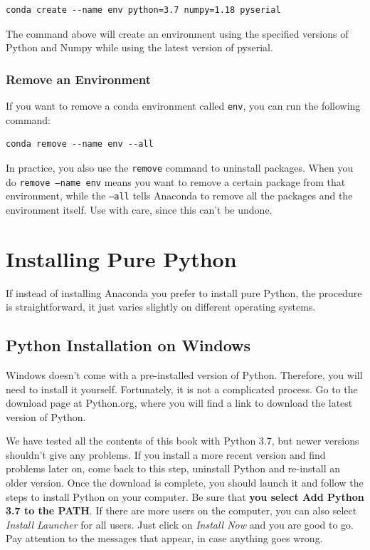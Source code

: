 \begin{verbatim}
conda create --name env python=3.7 numpy=1.18 pyserial
\end{verbatim}

The command above will create an environment using the specified versions of Python and Numpy while using the latest version of pyserial. 

\subsubsection{Remove an Environment}
If you want to remove a conda environment called \texttt{env}, you can run the following command:

\begin{verbatim}
conda remove --name env --all
\end{verbatim}

In practice, you also use the \texttt{remove} command to uninstall packages. When you do \texttt{remove --name env} means you want to remove a certain package from that environment, while the \texttt{--all} tells Anaconda to remove all the packages and the environment itself. Use with care, since this can't be undone. 

\section{Installing Pure Python}
If instead of installing Anaconda you prefer to install pure Python, the procedure is straightforward, it just varies slightly on different operating systems. 

\subsection{Python Installation on Windows}
Windows doesn't come with a pre-installed version of Python. Therefore, you will need to install it yourself. Fortunately, it is not a complicated process. Go to the download page at Python.org, where you will find a link to download the latest version of Python. 

We have tested all the contents of this book with Python 3.7, but newer versions shouldn't give any problems. If you install a more recent version and find problems later on, come back to this step, uninstall Python and re-install an older version. Once the download is complete, you should launch it and follow the steps to install Python on your computer. Be sure that \textbf{you select Add Python 3.7 to the PATH}. If there are more users on the computer, you can also select \emph{Install Launcher} for all users. Just click on \textit{Install Now} and you are good to go. Pay attention to the messages that appear, in case anything goes wrong.

